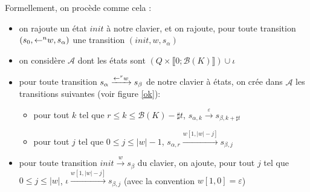 \documentclass[12pt, a4paper]{article}
\newcommand{\A}{\mathcal{A}}
\begin{document}
    Formellement, on procède comme cela : 
    \begin{itemize}
        \item on rajoute un état $init$ à notre clavier, et on rajoute, pour toute transition $(s_0,\mathord{\leftarrow}^n w,s_{\alpha})$ une transition $(init,w,s_{\alpha})$
        \item on considère $\A$ dont les états sont  $( Q \times \llbracket 0 ; \mathcal{B}(K) \rrbracket ) \cup \iota$
        \item pour toute transition $s_{\alpha} \xrightarrow{\mathord{\leftarrow}^r w} s_{\beta}$ de notre clavier à états, on crée dans $\A$ les transitions suivantes (voir figure \ref{ok}):
            \begin{itemize}
                \item pour tout $k$ tel que $r \leqslant k \leqslant \mathcal{B}(K) - \sharp t$, $s_{\alpha, k} \xrightarrow{\varepsilon} s_{\beta, k + \sharp t}$
                \item pour tout $j$ tel que $0 \leqslant j \leqslant |w| - 1$, $s_{\alpha, r} \xrightarrow{w[1,|w|-j]} s_{\beta, j}$
            \end{itemize} 
        \item pour toute transition $init \xrightarrow{w} s_{\beta}$ du clavier, on ajoute, pour tout $j$ tel que $0 \leqslant j \leqslant |w|$, $\iota \xrightarrow{w[1,|w|-j]} s_{\beta, j}$ (avec la convention $w[1,0] = \varepsilon$)   
    \end{itemize}
\end{document}
